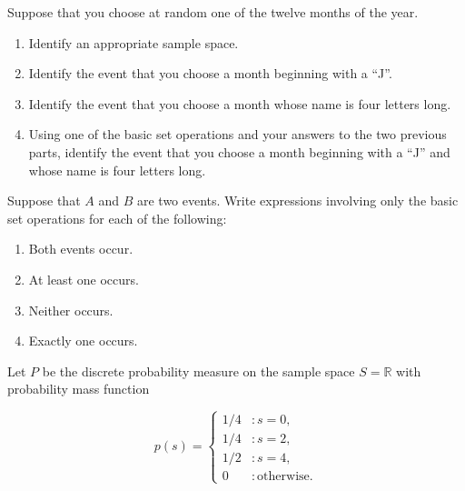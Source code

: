 \documentclass[12pt,reqno]{amsart}
\begin{document}
\prob Suppose that you choose at random one of the twelve months of the year.

\medskip
\begin{enumerate}
\item Identify an appropriate sample space.\vfill
\item Identify the event that you choose a month beginning with a ``J''.\vfill
\item Identify the event that you choose a month whose name is four letters long.\vfill
\item Using one of the basic set operations and your answers to the two previous parts, identify the event that you choose a month beginning with a ``J'' and whose name is four letters long.\vfill
\end{enumerate}

























\prob Suppose that $A$ and $B$ are two events. Write expressions involving only the basic set operations for each of the following:

\bigskip
\begin{enumerate}
\item Both events occur.\vfill
\item At least one occurs.\vfill
\item Neither occurs.\vfill
\item Exactly one occurs.\vfill
\end{enumerate}














\newpage
\prob Let $P$ be the discrete probability measure on the sample space $S=\mathbb{R}$ with probability mass function

	\[
	p(s) = \begin{cases}
	1/4 & : s=0, \\
	1/4 & : s=2, \\
	1/2 & : s=4, \\
	0 & : \text{otherwise}.
	\end{cases}
	\]
\end{document}
